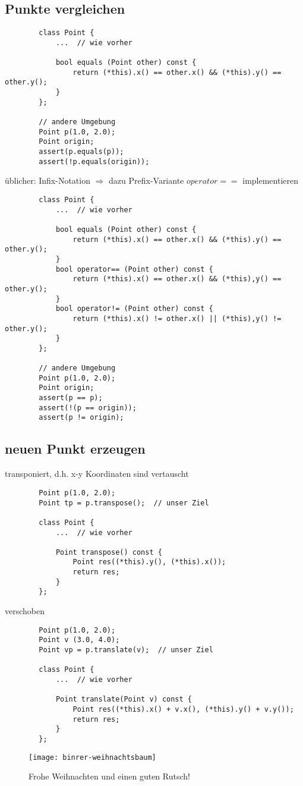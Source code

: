 \documentclass{article}
\begin{document}
\subsection{Punkte vergleichen}

	\begin{lstlisting}
		class Point {
			...  // wie vorher

			bool equals (Point other) const {
			    return (*this).x() == other.x() && (*this).y() == other.y();
			}
		};

		// andere Umgebung
		Point p(1.0, 2.0);
		Point origin;
		assert(p.equals(p));
		assert(!p.equals(origin));
	\end{lstlisting}

		üblicher: Infix-Notation $\Rightarrow $ dazu Prefix-Variante $operator ==$ implementieren
	\begin{lstlisting}
		class Point {
			...  // wie vorher

			bool equals (Point other) const {
			    return (*this).x() == other.x() && (*this).y() == other.y();
			}
			bool operator== (Point other) const {
				return (*this).x() == other.x() && (*this),y() == other.y();
			}
			bool operator!= (Point other) const {
				return (*this).x() != other.x() || (*this),y() != other.y();
			}
		};

		// andere Umgebung
		Point p(1.0, 2.0);
		Point origin;
		assert(p == p);
		assert(!(p == origin));
		assert(p != origin);
	\end{lstlisting}

\subsection{neuen Punkt erzeugen}
	transponiert, d.h. x-y Koordinaten sind vertauscht
	\begin{lstlisting}
		Point p(1.0, 2.0);
		Point tp = p.transpose();  // unser Ziel
	
		class Point {
			...  // wie vorher

			Point transpose() const {
				Point res((*this).y(), (*this).x());
				return res;
			}
		};
	\end{lstlisting}
	verschoben
	\begin{lstlisting}
		Point p(1.0, 2.0);
		Point v (3.0, 4.0);
		Point vp = p.translate(v);  // unser Ziel
	
		class Point {
			...  // wie vorher

			Point translate(Point v) const {
				Point res((*this).x() + v.x(), (*this).y() + v.y());
				return res;
			}
		};
	\end{lstlisting}





\begin{figure} [h]
	\centering
	\texttt{[image: binrer-weihnachtsbaum]}
	\caption*{Frohe Weihnachten und einen guten Rutsch!}
\end{figure}
\end{document}
